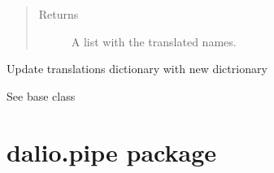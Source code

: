 \documentclass[letterpaper,10pt,english]{sphinxmanual}
\begin{document}
\begin{fulllineitems}
\begin{fulllineitems}
\begin{quote}
\begin{description}
\item[{Returns}] \leavevmode
A list with the translated names.

\end{description}\end{quote}

\end{fulllineitems}


\begin{fulllineitems}
\end{fulllineitems}


\begin{fulllineitems}
\label{\detokenize{dalio.translator:dalio.translator.translator.Translator.update_translations}}
Update translations dictionary with new dictrionary

\end{fulllineitems}


\begin{fulllineitems}
\label{\detokenize{dalio.translator:dalio.translator.translator.Translator.with_input}}
See base class

\end{fulllineitems}


\end{fulllineitems}



\chapter{dalio.pipe package}
\label{\detokenize{dalio.pipe:dalio-pipe-package}}\label{\detokenize{dalio.pipe::doc}}
\end{document}
